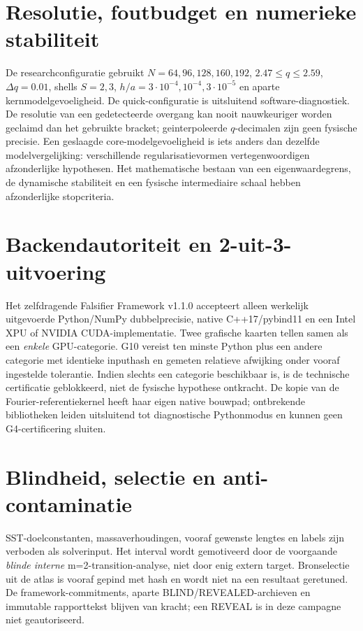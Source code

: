 \documentclass[11pt,a4paper]{article}
\begin{document}
\section{Resolutie, foutbudget en numerieke stabiliteit}
De researchconfiguratie gebruikt $N=64,96,128,160,192$, $2.47\le q\le2.59$, $\Delta q=0.01$, shells $S=2,3$, $h/a=3\cdot10^{-4},10^{-4},3\cdot10^{-5}$ en aparte kernmodelgevoeligheid. De quick-configuratie is uitsluitend software-diagnostiek. De resolutie van een gedetecteerde overgang kan nooit nauwkeuriger worden geclaimd dan het gebruikte bracket; geinterpoleerde $q$-decimalen zijn geen fysische precisie.
Een geslaagde core-modelgevoeligheid is iets anders dan dezelfde modelvergelijking: verschillende regularisatievormen vertegenwoordigen afzonderlijke hypothesen. Het mathematische bestaan van een eigenwaardegrens, de dynamische stabiliteit en een fysische intermediaire schaal hebben afzonderlijke stopcriteria.

\section{Backendautoriteit en 2-uit-3-uitvoering}
Het zelfdragende Falsifier Framework v1.1.0 accepteert alleen werkelijk uitgevoerde Python/NumPy dubbelprecisie, native C++17/pybind11 en een Intel XPU of NVIDIA CUDA-implementatie. Twee grafische kaarten tellen samen als een \emph{enkele} GPU-categorie. G10 vereist ten minste Python plus een andere categorie met identieke inputhash en gemeten relatieve afwijking onder vooraf ingestelde tolerantie. Indien slechts een categorie beschikbaar is, is de technische certificatie geblokkeerd, niet de fysische hypothese ontkracht. De kopie van de Fourier-referentiekernel heeft haar eigen native bouwpad; ontbrekende bibliotheken leiden uitsluitend tot diagnostische Pythonmodus en kunnen geen G4-certificering sluiten.

\section{Blindheid, selectie en anti-contaminatie}
SST-doelconstanten, massaverhoudingen, vooraf gewenste lengtes en labels zijn verboden als solverinput. Het interval wordt gemotiveerd door de voorgaande \emph{blinde interne} m=2-transition-analyse, niet door enig extern target. Bronselectie uit de atlas is vooraf gepind met hash en wordt niet na een resultaat geretuned. De framework-commitments, aparte BLIND/REVEALED-archieven en immutable rapporttekst blijven van kracht; een REVEAL is in deze campagne niet geautoriseerd.
\end{document}
